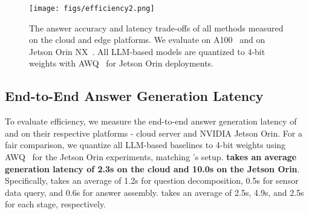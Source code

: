 \iffalse
\subsection{Memory Requirements on Edge Devices}
\label{sec:memory}
\textcolor{red}{To be updated} Fig.~\ref{fig:memory} compares the model size requirements of all finetuning methods. The left plot shows unquantized LLM models while the right plot shows quantized LLMs by AWQ~\cite{lin2023awq} and small models such as DeepSQA~\cite{xing2021deepsqa} and T5~\cite{2020t5}.
Without quantization, all LLM-based methods require at least 13.5GB memory to accommodate model weights, making them unsuitable for edge deployment.
With AWQ quantization, \Method reduces its memory footprint to 3.8GB and fits into the 8GB RAM of a Jetson TX2. While non-LLM models, such as DeepSQA and T5, use less than 1GB of memory, they provide less natural and accurate answers as shown in the previous section. Multimodal LLMs require more memory to support adapter layers, where AWQ cannot be applied directly.
%
Notably, \Method consumes nearly the same memory as the text-only LLaMA2-7B. 
Such a negligible memory overhead can be attributed to the compression of encoding raw timeseries into logits, which reduces the total dataset size from 24G to 484K, achieving a compression ratio of approximately 50K times.
The sensor encoder and logits database enable \Method to run lightweight query search on edge devices.
\fi

\begin{figure}
\begin{center}
\vspace{-4mm}
\texttt{[image: figs/efficiency2.png]} 
\vspace{-4mm}
\caption{The answer accuracy and latency trade-offs of all methods measured on the cloud and edge platforms. 
We evaluate \MethodC on A100~\cite{a100} and \MethodE on Jetson Orin NX~\cite{jetsonorin}.
All LLM-based models are quantized to 4-bit weights with AWQ~\cite{lin2023awq} for Jetson Orin deployments.}
\label{fig:latency}
\end{center}
\vspace{-4mm}
\end{figure}


\subsection{End-to-End Answer Generation Latency}
To evaluate efficiency, we measure the end-to-end answer generation latency of \MethodC and \MethodE on their respective platforms - cloud server and NVIDIA Jetson Orin. For a fair comparison, we quantize all LLM-based baselines to 4-bit weights using AWQ~\cite{lin2023awq} for the Jetson Orin experiments, matching \MethodE’s setup. \textbf{\Method takes an average generation latency of 2.3s on the cloud and 10.0s on the Jetson Orin}.  
Specifically, \MethodC takes an average of 1.2s for question decomposition, 0.5s for sensor data query, and 0.6s for answer assembly. \MethodE takes an average of 2.5s, 4.9s, and 2.5s for each stage, respectively.


